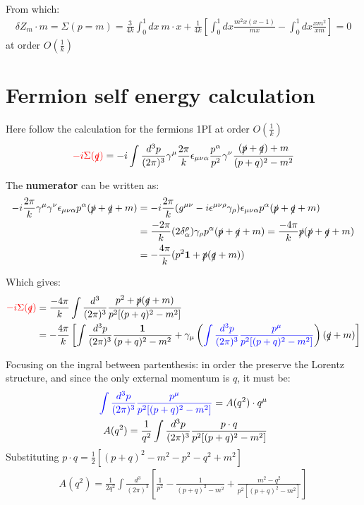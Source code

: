 \documentclass[a4paper,11pt,DIV=12]{scrartcl}
\begin{document}
From which:
\begin{align*}
    \delta Z_m \cdot m = \Sigma(p=m) = \frac{3}{4k}\int_0^1 dx\ m\cdot x  + \frac{1}{4k}\left[\int_0^1 dx \frac{m^2 x(x-1)}{m x} - \int_0^1 dx \frac{x m^2}{x m}\right]=0
\end{align*}
at order $O(\frac{1}{k})$

\newpage

\section{Fermion self energy calculation}

Here follow the calculation for the fermions 1PI at order $O(\frac{1}{k})$
\begin{equation}
    \textcolor{red} {-i \Sigma(\slashed{q})}=-i \int \frac{d^3 p}{(2\pi)^3}\gamma^\mu \frac{2\pi}{k} \epsilon_{\mu \nu \alpha} \frac{p^\alpha}{p^2}\gamma^\nu \frac{(\slashed{p}+\slashed{q})+m}{(p+q)^2-m^2}
\end{equation}

The \textbf{numerator} can be written as:
\begin{align*}
    -i\frac{2\pi}{k} \gamma^\mu \gamma^\nu \epsilon_{\mu \nu \alpha}p^\alpha (\slashed{p}+\slashed{q}+m)&=-i \frac{2\pi}{k}(g^{\mu \nu}-i\epsilon^{\mu \nu \rho}\gamma_\rho)\epsilon_{\mu \nu \alpha}p^\alpha(\slashed{p}+\slashed{q}+m) 
    \\ &= \frac{-2\pi}{k}(2\delta^\rho_\alpha) \gamma_\rho p^\alpha (\slashed{p}+\slashed{q}+m) =\frac{-4\pi}{k}\slashed{p}(\slashed{p}+\slashed{q}+m)
    \\ &=-\frac{4\pi}{k}(p^2 \mathbf{1} + \slashed{p}(\slashed{q}+m))
\end{align*}

Which gives:
\begin{align*}
   \textcolor{red} {-i \Sigma(\slashed{q})} &=\frac{-4\pi}{k} \int \frac{d^3}{(2\pi)^3} \frac{p^2 + \slashed{p}(\slashed{q}+m)}{p^2[(p+q)^2-m^2]}
    \\ &= -\frac{4 \pi}{k}\left[ \int \frac{d^3p}{(2\pi)^3} \frac{\mathbf{1}}{(p+q)^2-m^2} + \gamma_\mu \left( \textcolor{blue}{\int \frac{d^3p}{(2\pi)^3} \frac{p^\mu}{p^2 [(p+q)^2 - m^2]}} \right) (\slashed{q}+m)  \right]
\end{align*}

Focusing on the ingral between partenthesis:
in order the preserve the Lorentz structure, and since the only external momentum is $q$, it must be:
\begin{align*}
    \textcolor{blue}{\int \frac{d^3p}{(2\pi)^3} \frac{p^\mu}{p^2 [(p+q)^2 - m^2]}} = A(q^2)\cdot q^\mu 
    \\
    A(q^2)= \frac{1}{q^2}\int \frac{d^3p}{(2\pi)^3} \frac{p\cdot q}{p^2 [(p+q)^2 - m^2]}
\end{align*}
Substituting $p\cdot q = \frac{1}{2}[(p+q)^2-m^2 - p^2 - q^2 + m^2]$
\begin{align*}
    A(q^2) = \frac{1}{2 q^2} \int \frac{d^3}{(2\pi)^3} \left[ \frac{1}{p^2} - \frac{1}{(p+q)^2-m^2} + \frac{m^2 - q^2}{p^2[(p+q)^2 - m^2]} \right]
\end{align*}
\end{document}
